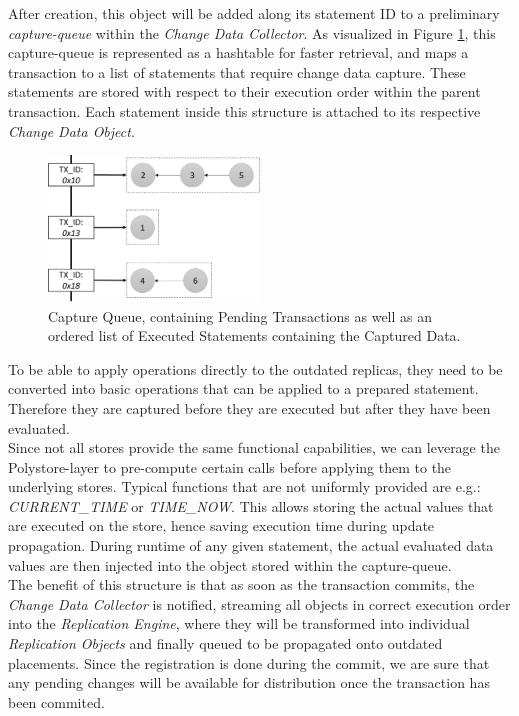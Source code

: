 After creation, this object will be added along its statement ID to a preliminary \emph{capture-queue} within the \emph{Change Data Collector}. 
As visualized in Figure \ref{fig:hashtable}, this capture-queue is represented as a hashtable for 
faster retrieval, and maps a transaction to a list of statements that require change data capture. 
These statements are stored with respect to their execution order within the parent transaction.
Each statement inside this structure is attached to its respective \emph{Change Data Object}.

\begin{figure}[t]
    \centering
    \includegraphics[width=0.5\textwidth]{Figures/hashtable.png}
    \caption{Capture Queue, containing Pending Transactions as well as an ordered list of Executed Statements containing the Captured Data.}
    \label{fig:hashtable}
\end{figure}

To be able to apply operations directly to the outdated replicas, they need to be converted into basic operations that can be applied to a prepared statement.
Therefore they are captured before they are executed but after they have been evaluated.\\
Since not all stores provide the same functional capabilities, we can leverage the Polystore-layer to pre-compute certain calls before applying them to the underlying stores.
Typical functions that are not uniformly provided are e.g.: \emph{CURRENT\_TIME} or \emph{TIME\_NOW}. This allows storing the actual values that are executed on the store,
hence saving execution time during update propagation.
During runtime of any given statement, the actual evaluated data values are then injected into the object stored within the capture-queue.\\
The benefit of this structure is that as soon as the transaction commits, the \emph{Change Data Collector} is notified, streaming all objects in correct execution order
into the \emph{Replication Engine}, where they will be transformed into individual \emph{Replication Objects} and finally queued to be propagated onto outdated placements. 
Since the registration is done during the commit, we are sure that any pending changes will be available for distribution once the transaction has been commited.




